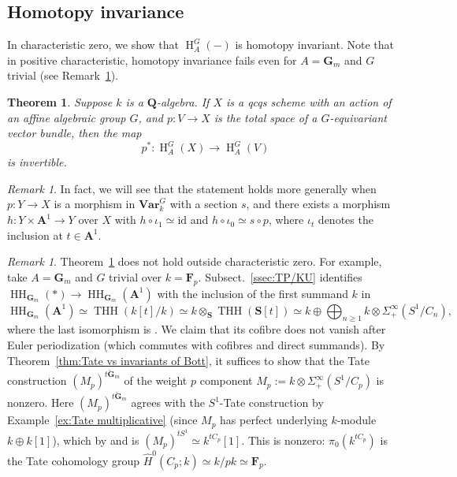 \documentclass[12pt, oneside]{amsart}
\numberwithin{equation}{section}
\newtheorem{theorem}[subsubsection]{Theorem}
\theoremstyle{remark}
\newtheorem{remark}[subsubsection]{Remark}
\theoremstyle{plain}
\renewcommand{\ge}{\geqslant}
\newcommand{\GG}{\mathbf{G}}
\newcommand{\GGm}{\mathbf{G}_{m}}
\newcommand{\Var}{\mathbf{Var}_{k}}
\newcommand{\id}{\mathrm{id}}
\newcommand{\aff}{\mathbf{A}^1}
\newcommand{\HH}{\operatorname{HH}}
\newcommand{\Hcoh}{\operatorname{H}}
\begin{document}
\subsection{Homotopy invariance}\label{ssec:homotopy invariance}

In characteristic zero, we show that $\Hcoh_A^G(-)$ is homotopy invariant.
Note that in positive characteristic, homotopy invariance fails even for $A=\GGm$ and $G$ trivial (see Remark~\ref{rem:HI char p}).

\begin{theorem}\label{thm:homotopy invariance}
Suppose $k$ is a $\mathbf{Q}$-algebra.
If $X$ is a qcqs scheme with an action of an affine algebraic group $G$, and $p : V \to X$ is the total space of a $G$-equivariant vector bundle, then the map $$p^* : \Hcoh_A^G(X)\rightarrow \Hcoh_A^G(V)$$ is invertible.
\end{theorem}

\begin{remark}
In fact, we will see that the statement holds more generally when $p : Y \to X$ is a morphism in $\Var^G$ with a section $s$, and there exists a morphism $h : Y \times \aff \to Y$ over $X$ with $h \circ \iota_1 \simeq \id$ and $h \circ \iota_0 \simeq s \circ p$, where $\iota_t$ denotes the inclusion at $t \in \aff$.
\end{remark}

\begin{remark}\label{rem:HI char p}
Theorem~\ref{thm:homotopy invariance} does not hold outside characteristic zero.
For example, take $A=\GGm$ and $G$ trivial over $k=\mathbf{F}_p$.
Subsect.~\ref{ssec:TP/KU} identifies $\HH_{\GGm}(*) \to \HH_{\GGm}(\aff)$ with the inclusion of the first summand $k$ in
\[
  \HH_{\GGm}(\aff)
  \simeq \operatorname{THH}(k[t]/k)
  \simeq k\otimes_{\mathbf{S}}\operatorname{THH}(\mathbf{S}[t])
  \simeq k\oplus\bigoplus_{n\ge1}
  k\otimes\Sigma^\infty_+(S^1/C_n),
\]
where the last isomorphism is \cite[Prop.~11.3]{BMS2}.
We claim that its cofibre does not vanish after Euler periodization (which commutes with cofibres and direct summands).
By Theorem~\ref{thm:Tate vs invariants of Bott}, it suffices to show that the Tate construction $(M_p)^{t\check{\GG}_m}$ of the weight $p$ component $M_p := k\otimes\Sigma^\infty_+(S^1/C_p)$ is nonzero.
Here $(M_p)^{t\check{\GG}_m}$ agrees with the $S^1$-Tate construction by Example~\ref{ex:Tate multiplicative} (since $M_p$ has perfect underlying $k$-module $k\oplus k[1]$), which by \cite[Thm.~4.10]{GreenleesMay} and \cite[Prop.~3.8]{GreenleesMayTate} is $(M_p)^{tS^1} \simeq k^{tC_p}[1]$.
This is nonzero: $\pi_0(k^{tC_p})$ is the Tate cohomology group $\widehat{H}^0(C_p; k) \simeq k/pk \simeq \mathbf{F}_p$.
\end{remark}
\end{document}
